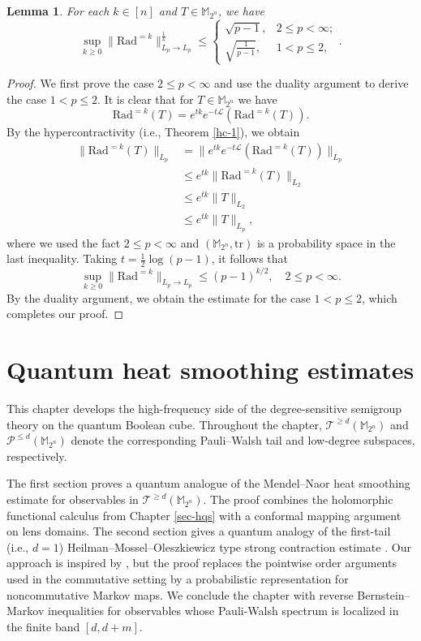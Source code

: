 \documentclass{amsbook}
\newtheorem{lemma}[theorem]{Lemma}
\theoremstyle{definition}
\theoremstyle{remark}
\numberwithin{section}{chapter}
\numberwithin{equation}{chapter}
\newcommand{\M}{\mathbb{M}}
\newcommand{\1}{\mathbf{1}}
\begin{document}
\begin{lemma}\label{radk-ppb}
For each $k\in[n]$ and $T\in\mathbb{M}_{2^n}$, we have 
$$\sup_{k\geq0}\|\mathrm{Rad}^{=k}\|_{L_{p}\rightarrow L_{p}}^{\frac{1}{k}}\leq
\begin{cases} 
\sqrt{p-1}, & 2\leq p<\infty; \\ 
\sqrt{\frac{1}{p-1}}, & 1<p\leq2, 
\end{cases}.$$
\end{lemma}
\begin{proof} 
We first prove the case $2\leq p<\infty$ and use the duality argument to derive the case $1<p\leq 2$. It is clear that for $T\in \mathbb{M}_{2^{n}}$ we have
\[
\mathrm{Rad}^{=k}(T)=e^{tk}e^{-t\mathcal{L}}(\mathrm{Rad}^{=k}(T)).
\]
By the hypercontractivity (i.e., Theorem \ref{hc-1}), we obtain
\begin{align*}
\|\mathrm{Rad}^{=k}(T)\|_{L_{p}}&=\|e^{tk}e^{-t\mathcal{L}}(\mathrm{Rad}^{=k}(T))\|_{L_{p}}\\
&\leq e^{tk}\|\mathrm{Rad}^{=k}(T)\|_{L_2}\\
&\leq e^{tk}\|T\|_{L_2}\\
&\leq e^{tk}\|T\|_{L_{p}},
\end{align*}
where we used the fact $2\leq p<\infty$ and $(\mathbb{M}_{2^n},\mathrm{tr})$ is a probability space in the last inequality.
Taking $t=\frac{1}{2}\log(p-1)$,  it follows that
$$\sup_{k\geq0}\|\mathrm{Rad}^{=k}\|_{L_{p}\rightarrow L_{p}}\leq (p-1)^{k/2},\quad 2\leq p<\infty.$$
By the duality argument, we obtain the estimate for the case $1<p\leq2$, which completes our proof.
\end{proof}

\chapter{Quantum heat smoothing estimates}\label{sec-qhse}

This chapter develops the high-frequency side of the degree-sensitive semigroup theory on the quantum Boolean cube.  Throughout the chapter, $\mathcal{T}^{\geq d}(\M_{2^n})$ and $\mathcal{P}^{\leq d}(\M_{2^n})$ denote the corresponding Pauli--Walsh tail and low-degree subspaces, respectively.

The first section proves a quantum analogue of the Mendel--Naor heat smoothing estimate \cite{MN2014} for observables in $\mathcal{T}^{\geq d}(\M_{2^n})$.  The proof combines the holomorphic functional calculus from Chapter \ref{sec-hqs} with a conformal mapping argument on lens domains.  The second section gives a quantum analogy of the first-tail (i.e., $d=1$) Heilman--Mossel--Oleszkiewicz type strong contraction estimate \cite{HMO2017}. Our approach is inspired by \cite{HMO2017}, but the proof replaces the pointwise order arguments used in the commutative setting by a probabilistic representation for noncommutative Markov maps.  We conclude the chapter with reverse Bernstein--Markov inequalities for observables whose Pauli-Walsh spectrum is localized in the finite band $[d,d+m]$.
\end{document}
